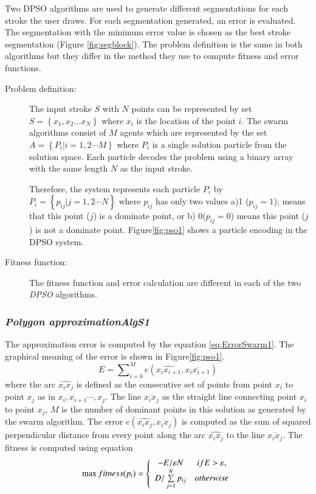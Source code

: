 \documentclass[preprint,1p,times,review]{elsarticle}
\begin{document}
Two DPSO algorithms are used to generate different segmentations for each stroke the user draws. For each segmentation generated, an error is evaluated. The segmentation with the minimum error value is chosen as the best stroke segmentation (Figure \ref{fig:segblock}). The problem definition is the same in both algorithms but they differ in the method they use to compute fitness and error functions.
\begin{description}
	\item[ Problem definition:] The input stroke $S$  with $N$ points can be
represented by set $S = \left\{ {x_1 ,x_2  \ldots x_N }\right\}$ where $x_i$ is the location of the point $i$. The swarm algorithms consist of $M$ agents which are represented by the set $A = \left\{ {P_i \left| {i = 1,2 \cdots M} \right.} \right\}$ where $P_i$ is a single solution particle from the solution space. Each particle decodes the problem using a binary array with the same length $N$ as the input stroke.

Therefore, the system represents each particle $P_i$ by $P_i = \left\{ {p_{ij}
\left| {j = 1,2 \cdots N} \right.} \right\}$ where $p_{ij}$ has only two values
a)1 ($p_{ij}=1$); means that this point ($j$) is a dominate point, or b)
0($p_{ij}=0$) means this point ($j$) is not a dominate point.
Figure\ref{fig:pso1} shows a particle encoding in the DPSO system.
	\item[Fitness function:] The fitness function and error calculation are
different in each of the two \textit{DPSO} algorithms.
	\end{description}
\subsubsection{\textit{Polygon approximation\textsl{AlgS1}}}
The approximation error is computed by the equation \ref{eq:ErrorSwarm1}. The
graphical meaning of the error is shown in Figure\ref{fig:pso1}.%
\begin{equation}
E=\sum\nolimits_{i = 0}^M e ( \widehat{x_ix_{i+1}},\overline{x_i x_{i+1}}) \label{eq:ErrorSwarm1} \end{equation} 
where the arc $\widehat{x_ix_j}$ is defined as the consecutive set of points from point $x_i$ to point $x_{j}$ as in $x_i,x_{i+1} \cdots,x_j$. The line $\overline{x_i x_j} $ as the straight line connecting point $x_i$ to point $x_j$, $M$ is the number of dominant points in this solution as generated by the swarm algorithm. The error $e ( \widehat{x_ix_j},\overline{x_i x_j})$ is computed as the sum of squared perpendicular distance from every point along the arc $\widehat{x_ix_j}$ to the line $\overline{x_i x_j}$. The fitness is computed
using equation %
\begin{equation}
\max fitness(p_i ) = \left\{ {\begin{array}{*{20}c}
   { - E/\varepsilon N} & {ifE > \varepsilon ,}  \\
   {D/\sum\limits_{j = 1}^N {p_{ij} } } & {otherwise}  \\ 
   \end{array}} \right. \label{eq:fitnessSwarm1} \end{equation} 
   
\end{document}
